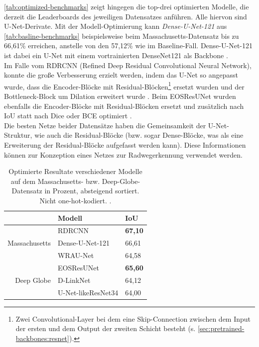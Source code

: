 \autoref{tab:optimized-benchmarks} zeigt hingegen die top-drei optimierten Modelle, die derzeit die Leaderboards 
des jeweiligen Datensatzes anführen. Alle hiervon sind U-Net-Derivate.
Mit der Modell-Optimierung kann \textit{Dense-U-Net-121} aus \autoref{tab:basline-benchmarks} beispielsweise beim Massachusetts-Datensatz 
bis zu 66,61\% erreichen, anstelle von den 57,12\% wie im Baseline-Fall. 
Dense-U-Net-121 ist dabei ein U-Net mit einem vortrainierten DenseNet121 als Backbone \cite{C.Henry.2021}. \\
Im Falle vom RDRCNN (Refined Deep Residual Convolutional Neural Network), konnte die große Verbesserung erzielt werden,
indem das U-Net so angepasst wurde, dass die Encoder-Blöcke mit Residual-Blöcken\footnote{Zwei Convolutional-Layer bei dem eine Skip-Connection zwischen dem Input der ersten und dem Output der zweiten Schicht besteht (s. \autoref{sec:pretrained-backbones:resnet}).} 
ersetzt wurden und der Bottleneck-Block
um Dilation erweitert wurde \cite{Gao.2019}. 
Beim EOSResUNet wurden ebenfalls die Encoder-Blöcke mit Residual-Blöcken ersetzt und zusätzlich nach \ac{IoU} statt nach Dice oder \ac{BCE} optimiert \cite{O.Filin.2018}. \\
Die besten Netze beider Datensätze haben die Gemeinsamkeit der U-Net-Struktur, wie auch die Residual-Blöcke (bzw.
sogar Dense-Blöcke, was als eine Erweiterung der Residual-Blöcke aufgefasst werden kann). 
Diese Informationen können zur Konzeption eines Netzes zur Radwegerkennung verwendet werden.  

\newcommand*\rot{\rotatebox{60}}

\begin{table}
	\centering
	\begin{tabular}{r|l|l}
		& Modell & IoU \\
		\midrule
		& RDRCNN & \textbf{67,10} \\
		Massachusetts & Dense-U-Net-121 & 66,61  \\
		& WRAU-Net & 64,58 \\
		\midrule
		& EOSResUNet & \textbf{65,60} \\
		Deep Globe & D-LinkNet & 64,12 \\
		& U-Net-likeResNet34 & 64,00 \\
	\end{tabular}
	\caption{Optimierte Resultate verschiedener Modelle auf dem Massachusetts- 
	bzw. Deep-Globe-Datensatz in Prozent, absteigend sortiert. Nicht one-hot-kodiert. \cite{C.Henry.2021}.}
	\label{tab:optimized-benchmarks}
\end{table}

